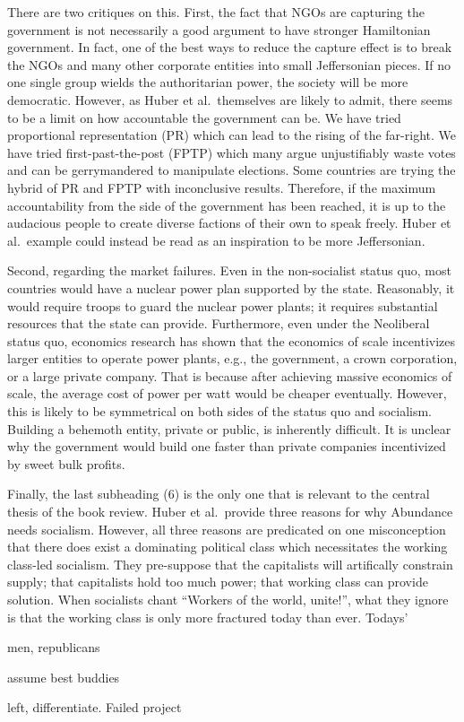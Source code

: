 \documentclass[12pt]{article}
\begin{document}
There are two critiques on this. First, the fact that NGOs are capturing the government is not necessarily a good argument to have stronger Hamiltonian government. In fact, one of the best ways to reduce the capture effect is to break the NGOs and many other corporate entities into small Jeffersonian pieces. If no one single group wields the authoritarian power, the society will be more democratic. However, as Huber et al.\ themselves are likely to admit, there seems to be a limit on how accountable the government can be. We have tried proportional representation (PR) which can lead to the rising of the far-right. We have tried first-past-the-post (FPTP) which many argue unjustifiably waste votes and can be gerrymandered to manipulate elections. Some countries are trying the hybrid of PR and FPTP with inconclusive results. Therefore, if the maximum accountability from the side of the government has been reached, it is up to the audacious people to create diverse factions of their own to speak freely. Huber et al.\ example could instead be read as an inspiration to be more Jeffersonian.

Second, regarding the market failures. Even in the non-socialist status quo, most countries would have a nuclear power plan supported by the state. Reasonably, it would require troops to guard the nuclear power plants; it requires substantial resources that the state can provide. Furthermore, even under the Neoliberal status quo, economics research has shown that the economics of scale incentivizes larger entities to operate power plants, e.g., the government, a crown corporation, or a large private company. That is because after achieving massive economics of scale, the average cost of power per watt would be cheaper eventually. However, this is likely to be symmetrical on both sides of the status quo and socialism. Building a behemoth entity, private or public, is inherently difficult. It is unclear why the government would build one faster than private companies incentivized by sweet bulk profits.

Finally, the last subheading (6) is the only one that is relevant to the central thesis of the book review. Huber et al.\ provide three reasons for why Abundance needs socialism. However, all three reasons are predicated on one misconception\textemdash{} that there does exist a dominating political class which necessitates the working class-led socialism. They pre-suppose that the capitalists will artifically constrain supply; that capitalists hold too much power; that working class can provide solution. When socialists chant ``Workers of the world, unite!'', what they ignore is that the working class is only more fractured today than ever. Todays' 

men, republicans

assume best buddies


left, differentiate. Failed project
\end{document}
